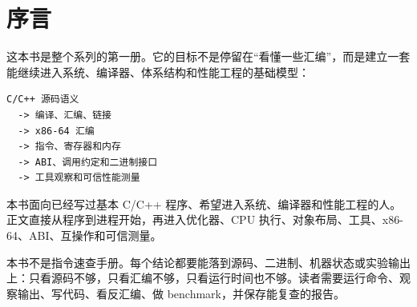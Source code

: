 \chapter*{序言}

这本书是整个系列的第一册。它的目标不是停留在“看懂一些汇编”，而是建立一套能继续进入系统、编译器、体系结构和性能工程的基础模型：

\begin{center}
\begin{minipage}{0.82\linewidth}
\begin{verbatim}
C/C++ 源码语义
  -> 编译、汇编、链接
  -> x86-64 汇编
  -> 指令、寄存器和内存
  -> ABI、调用约定和二进制接口
  -> 工具观察和可信性能测量
\end{verbatim}
\end{minipage}
\end{center}

本书面向已经写过基本 C/C++ 程序、希望进入系统、编译器和性能工程的人。正文直接从程序到进程开始，再进入优化器、CPU 执行、对象布局、工具、x86-64、ABI、互操作和可信测量。

本书不是指令速查手册。每个结论都要能落到源码、二进制、机器状态或实验输出上：只看源码不够，只看汇编不够，只看运行时间也不够。读者需要运行命令、观察输出、写代码、看反汇编、做 benchmark，并保存能复查的报告。
